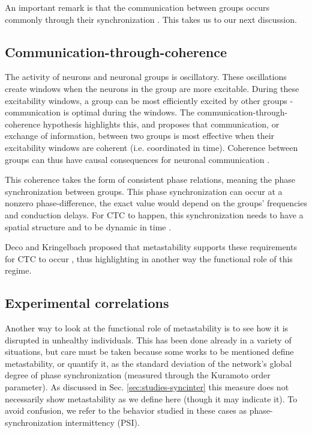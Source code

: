 \documentclass[preprint,superscriptaddress,showpacs,amsmath,amssymb,aps,pre,floatfix]{revtex4-1}
\theoremstyle{definition}
\begin{document}
An important remark is that the communication between groups occurs commonly through their synchronization \cite{fingelkurts_2008}. This takes us to our next discussion.



\subsection{Communication-through-coherence}
The activity of neurons and neuronal groups is oscillatory. These oscillations create windows when the neurons in the group are more excitable. During these excitability windows, a group can be most efficiently excited by other groups - communication is optimal during the windows. The communication-through-coherence hypothesis \cite{fries_2005, fries_2015} highlights this, and proposes that communication, or exchange of information, between two groups is most effective when their excitability windows are coherent (i.e. coordinated in time). Coherence between groups can thus have causal consequences for neuronal communication \cite{deco_2016}.

This coherence takes the form of consistent phase relations, meaning the phase synchronization between groups. This phase synchronization can occur at a nonzero phase-difference, the exact value would depend on the groups' frequencies and conduction delays. For CTC to happen, this synchronization needs to have a spatial structure and to be dynamic in time \cite{deco_2016}.

Deco and Kringelbach proposed that metastability supports these requirements for CTC to occur \cite{deco_2016}, thus highlighting in another way the functional role of this regime.


\subsection{Experimental correlations}
Another way to look at the functional role of metastability is to see how it is disrupted in unhealthy individuals. This has been done already in a variety of situations, but care must be taken because some works to be mentioned define metastability, or quantify it, as the standard deviation of the network's global degree of phase synchronization (measured through the Kuramoto order parameter). As discussed in Sec. \ref{sec:studies-syncinter} this measure does not necessarily show metastability as we define here (though it may indicate it). To avoid confusion, we refer to the behavior studied in these cases as phase-synchronization intermittency (PSI). 
\end{document}
